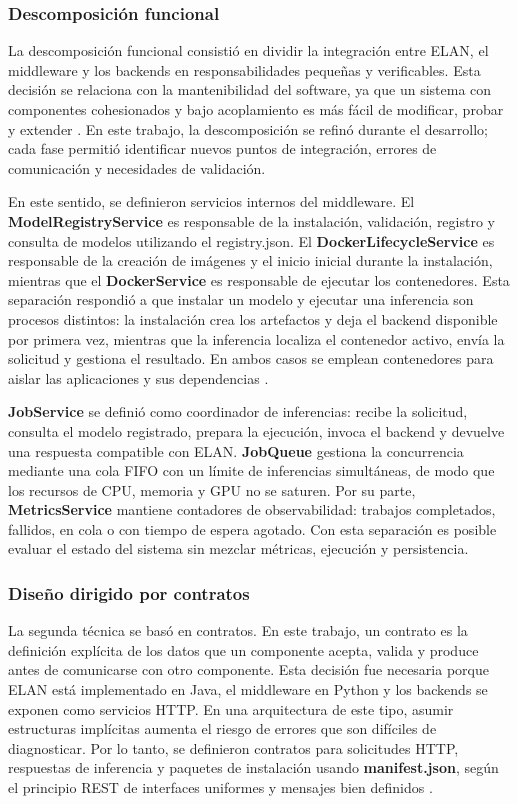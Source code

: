 \subsubsection{Descomposición funcional}

La descomposición funcional consistió en dividir la integración entre ELAN, el middleware y los backends en responsabilidades pequeñas y verificables. Esta decisión se relaciona con la mantenibilidad del software, ya que un sistema con componentes cohesionados y bajo acoplamiento es más fácil de modificar, probar y extender \cite{iso25010}. En este trabajo, la descomposición se refinó durante el desarrollo; cada fase permitió identificar nuevos puntos de integración, errores de comunicación y necesidades de validación.

En este sentido, se definieron servicios internos del middleware. El \textbf{ModelRegistryService} es responsable de la instalación, validación, registro y consulta de modelos utilizando el registry.json. El \textbf{DockerLifecycleService} es responsable de la creación de imágenes y el inicio inicial durante la instalación, mientras que el \textbf{DockerService} es responsable de ejecutar los contenedores. Esta separación respondió a que instalar un modelo y ejecutar una inferencia son procesos distintos: la instalación crea los artefactos y deja el backend disponible por primera vez, mientras que la inferencia localiza el contenedor activo, envía la solicitud y gestiona el resultado. En ambos casos se emplean contenedores para aislar las aplicaciones y sus dependencias \cite{docker2026overview}.

\textbf{JobService} se definió como coordinador de inferencias: recibe la solicitud, consulta el modelo registrado, prepara la ejecución, invoca el backend y devuelve una respuesta compatible con ELAN. \textbf{JobQueue} gestiona la concurrencia mediante una cola FIFO con un límite de inferencias simultáneas, de modo que los recursos de CPU, memoria y GPU no se saturen. Por su parte, \textbf{MetricsService} mantiene contadores de observabilidad: trabajos completados, fallidos, en cola o con tiempo de espera agotado. Con esta separación es posible evaluar el estado del sistema sin mezclar métricas, ejecución y persistencia.

\subsubsection{Diseño dirigido por contratos}

La segunda técnica se basó en contratos. En este trabajo, un contrato es la definición explícita de los datos que un componente acepta, valida y produce antes de comunicarse con otro componente. Esta decisión fue necesaria porque ELAN está implementado en Java, el middleware en Python y los backends se exponen como servicios HTTP. En una arquitectura de este tipo, asumir estructuras implícitas aumenta el riesgo de errores que son difíciles de diagnosticar. Por lo tanto, se definieron contratos para solicitudes HTTP, respuestas de inferencia y paquetes de instalación usando \textbf{manifest.json}, según el principio REST de interfaces uniformes y mensajes bien definidos \cite{fielding2000rest}.

